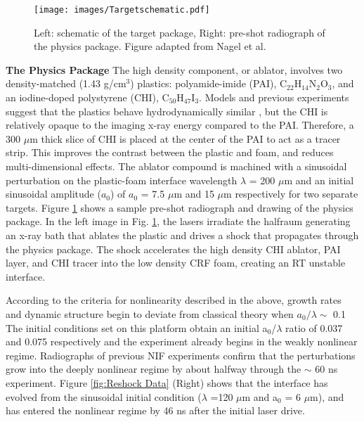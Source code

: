 \documentclass[%
 aip,
 amsmath,amssymb,
 reprint,
 floatfix
]{revtex4-1}
\begin{document}
  \begin{figure}
 \begin{center}
 \texttt{[image: images/Targetschematic.pdf]}
 \caption{Left: schematic of the target package, Right: pre-shot radiograph of the physics package. Figure adapted from Nagel et al. \cite{Nagel:2017}}
 \label{fig:TargetLayout}
 \end{center}
 \end{figure}
 

\noindent \textbf{The Physics Package} The high density component, or ablator,  involves two density-matched (1.43 g/cm$^3$) plastics: polyamide-imide (PAI), C$_{22}$H$_{14}$N$_2$O$_3$, and an iodine-doped polystyrene (CHI), C$_{50}$H$_{47}$I$_3$.  Models and previous experiments suggest that the plastics behave hydrodynamically similar \cite{Nagel:2017}, but the CHI is relatively opaque to the imaging x-ray energy compared to the PAI.  Therefore, a 300 $\mu$m thick slice of CHI is placed at the center of the PAI to act as a tracer strip. This improves the contrast between the plastic and foam, and reduces multi-dimensional effects. The ablator compound is machined with a sinusoidal perturbation on the plastic-foam interface wavelength $\lambda$ = 200 $\mu$m and an initial sinusoidal amplitude ($a_{0}$) of  $a_{0}$ = 7.5 $\mu$m and 15 $\mu$m  respectively for two separate targets. Figure \ref{fig:TargetLayout} shows a sample pre-shot radiograph and drawing of the physics package. In the left image in Fig. \ref{fig:TargetLayout}, the lasers irradiate the halfraum generating an x-ray bath that ablates the plastic and drives a shock that propagates through the physics package. \cite{Nagel:2017} The shock accelerates the high density CHI ablator, PAI layer, and CHI tracer into the low density CRF foam, creating an RT unstable interface. 


 According to the criteria for nonlinearity described in the above,  growth rates and dynamic structure begin to deviate from classical theory when $a_{0}/\lambda \sim$ 0.1 The initial conditions set on this platform obtain an initial  a$_{0}$/$\lambda$ ratio of 0.037 and 0.075 respectively and the experiment already begins in the weakly nonlinear regime. Radiographs of previous NIF experiments confirm that the perturbations grow into the deeply nonlinear regime by about halfway through the $\sim$ 60 ns experiment. \cite{Robey:2003, Nagel:2017} Figure \ref{fig:Reshock Data} (Right) shows that the interface has evolved from the sinusoidal initial condition ($\lambda$ =120  $\mu$m and a$_0$ = 6  $\mu$m), and has entered the nonlinear regime by 46 ns after the initial laser drive. 
 
\end{document}
